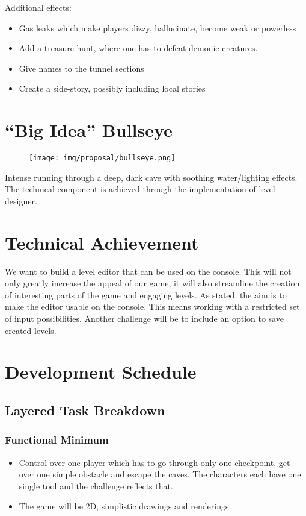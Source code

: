 \vspace{0.5cm}
Additional effects:
\begin{itemize}
    \item Gas leaks which make players dizzy, hallucinate, become weak or powerless
    \item Add a treasure-hunt, where one has to defeat demonic creatures.
    \item Give names to the tunnel sections 
    \item Create a side-story, possibly including local stories

\end{itemize}


\section{\enquote{Big Idea} Bullseye}
\begin{figure}[h!]
    \centering
    \texttt{[image: img/proposal/bullseye.png]}
\end{figure}
Intense running through a deep, dark cave with soothing water/lighting effects. The technical component is achieved through the implementation of level designer.


\section{Technical Achievement}
We want to build a level editor that can be used on the console. This will not only greatly increase the appeal of our game, it will also streamline the creation of interesting parts of the game and engaging levels.
As stated, the aim is to make the editor usable on the console. This means working with a restricted set of input possibilities. Another challenge will be to include an option to save created levels.

\section{Development Schedule}
\subsection{Layered Task Breakdown}
\subsubsection{Functional Minimum}
\begin{itemize}
    \item Control over one player which has to go through only one checkpoint, get over one simple obstacle and escape the caves. The characters each have one single tool and the challenge reflects that. 
\item The game will be 2D, simplistic drawings and renderings.
\end{itemize}

